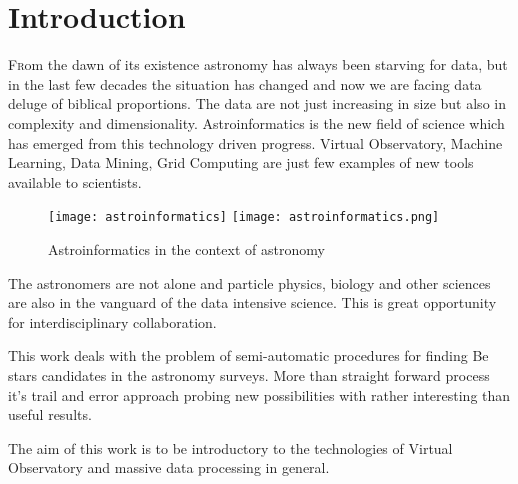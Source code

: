 \chapter*{Introduction}


\renewcommand{\LettrineFontHook}{\color{red}}


\lettrine[lines = 3, loversize=-0.1, lraise=0.1]{F}rom the dawn of its
existence astronomy has always been starving for data, but in the last
few decades the situation has changed and now we are facing data
deluge of biblical proportions. The data are not just increasing in
size but also in complexity and
dimensionality. \cite{ballastroinformatics} Astroinformatics is the
new field of science which has emerged from this technology driven
progress.  Virtual Observatory, Machine Learning, Data Mining, Grid
Computing are just few examples of new tools available to scientists.


\vspace{10pt}
\begin{figure}[!htbp]
  \begin{center}
    \leavevmode
    \ifpdf
    \texttt{[image: astroinformatics]}
    \else
    \texttt{[image: astroinformatics.png]}
    \fi
    \caption{Astroinformatics in the context of astronomy \cite{ballastroinformatics} }
    \label{FigAir}
  \end{center}
\end{figure}
\vspace{-10pt}



The astronomers are not alone and particle physics, biology and other
sciences are also in the vanguard of the data intensive science. This
is great opportunity for interdisciplinary collaboration.

This work deals with the problem of semi-automatic procedures for
finding Be stars \cite{porter2003classical} candidates in the
astronomy surveys. More than straight forward process it's trail and
error approach probing new possibilities with rather interesting than
useful results.

The aim of this work is to be introductory to the technologies of
Virtual Observatory and massive data processing in general.


